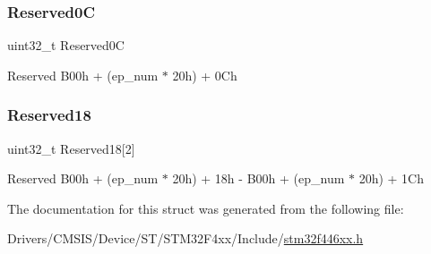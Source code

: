 \subsubsection{\texorpdfstring{Reserved0C}{Reserved0C}}
{\footnotesize\ttfamily uint32\+\_\+t Reserved0C}

Reserved B00h + (ep\+\_\+num $\ast$ 20h) + 0\+Ch \mbox{\label{struct_u_s_b___o_t_g___o_u_t_endpoint_type_def_a78fbe0aab076cfbf9df51dd6f67eaf82}} 
\subsubsection{\texorpdfstring{Reserved18}{Reserved18}}
{\footnotesize\ttfamily uint32\+\_\+t Reserved18\mbox{[}2\mbox{]}}

Reserved B00h + (ep\+\_\+num $\ast$ 20h) + 18h -\/ B00h + (ep\+\_\+num $\ast$ 20h) + 1\+Ch 

The documentation for this struct was generated from the following file\+:\begin{DoxyCompactItemize}
\item 
Drivers/\+C\+M\+S\+I\+S/\+Device/\+S\+T/\+S\+T\+M32\+F4xx/\+Include/\mbox{\hyperlink{stm32f446xx_8h}{stm32f446xx.\+h}}\end{DoxyCompactItemize}
